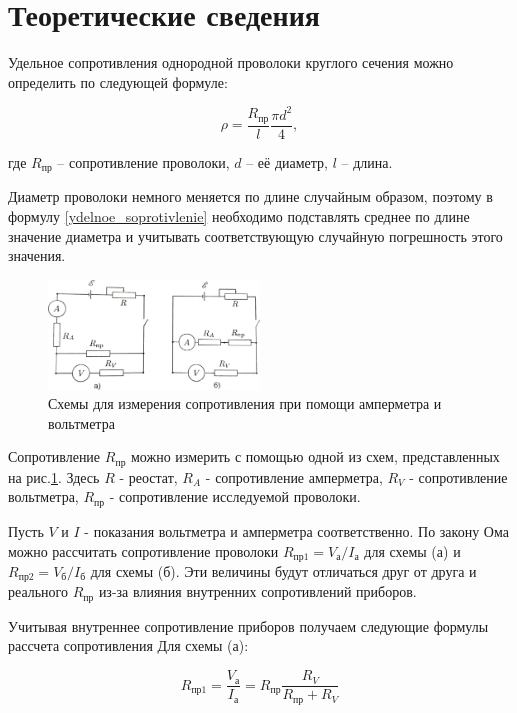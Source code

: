 \documentclass[a4paper,12pt]{article}
\begin{document}
\section{Теоретические сведения}

Удельное сопротивления однородной проволоки круглого сечения можно определить по следующей формуле:

\begin{equation}\label{ydelnoe_soprotivlenie}
\rho = \frac{R_{\text{пр}}}{l}\frac{\pi d^2}{4},
\end{equation}

\noindent где $R_{\text{пр}}$ -- сопротивление проволоки, $d$ -- её диаметр, $l$ -- длина.


Диаметр проволоки немного меняется по длине случайным образом, поэтому в формулу \eqref{ydelnoe_soprotivlenie} необходимо подставлять среднее по длине значение диаметра и учитывать соответствующую случайную погрешность этого значения.


\begin{figure}
\includegraphics[width=0.5\textwidth]{schemi}
\caption{Схемы для измерения сопротивления при помощи амперметра и вольтметра} \label{schemi}
\end{figure}

Сопротивление $R_{\text{пр}}$ можно измерить с помощью одной из схем, представленных на рис.\ref{schemi}. Здесь $R$ - реостат, $R_A$ - сопротивление амперметра, $R_V$ - сопротивление вольтметра, $R_{\text{пр}}$ - сопротивление исследуемой проволоки.


Пусть $V$ и $I$ - показания вольтметра и амперметра соответственно. По закону Ома можно рассчитать сопротивление проволоки $R_{\text{пр1}} = V_{\text{а}}/I_{\text{а}}$ для схемы (а) и $R_{\text{пр2}} = V_{\text{б}}/I_{\text{б}}$ для схемы (б). Эти величины будут отличаться друг от друга и реального $R_{\text{пр}}$ из-за влияния внутренних сопротивлений приборов.


Учитывая внутреннее сопротивление приборов получаем следующие формулы рассчета сопротивления
Для схемы (а):

\[ R_{\text{пр1}} =\dfrac{V_{\text{а}}}{I_{\text{а}}} = R_{\text{пр}}\dfrac{R_V}{R_{\text{пр}} + R_V} \]
\end{document}
